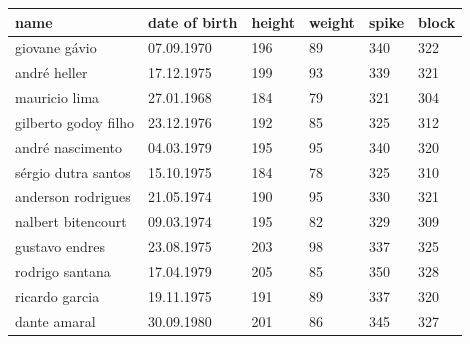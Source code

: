 \documentclass{article}
\begin{document}
\begin{tabular}{llllll}
\toprule
name & date of birth & height & weight & spike & block \\
\midrule
giovane gávio & 07.09.1970 & 196 & 89 & 340 & 322 \\
andré heller & 17.12.1975 & 199 & 93 & 339 & 321 \\
mauricio lima & 27.01.1968 & 184 & 79 & 321 & 304 \\
gilberto godoy filho & 23.12.1976 & 192 & 85 & 325 & 312 \\
andré nascimento & 04.03.1979 & 195 & 95 & 340 & 320 \\
sérgio dutra santos & 15.10.1975 & 184 & 78 & 325 & 310 \\
anderson rodrigues & 21.05.1974 & 190 & 95 & 330 & 321 \\
nalbert bitencourt & 09.03.1974 & 195 & 82 & 329 & 309 \\
gustavo endres & 23.08.1975 & 203 & 98 & 337 & 325 \\
rodrigo santana & 17.04.1979 & 205 & 85 & 350 & 328 \\
ricardo garcia & 19.11.1975 & 191 & 89 & 337 & 320 \\
dante amaral & 30.09.1980 & 201 & 86 & 345 & 327 \\
\bottomrule
\end{tabular}
\end{document}
